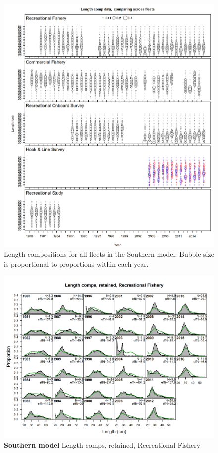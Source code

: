 \documentclass[12pt,]{article}
\begin{document}
\begin{figure}[htbp]
\centering
\includegraphics{r4ss/plots_mod2/comp_lendat__multi-fleet_comparison.png}
\caption{Length compositions for all fleets in the Southern model.
Bubble size is proportional to proportions within each year.
\label{fig:comp_length_bubble_mod2}}
\end{figure}

\begin{figure}[htbp]
\centering
\includegraphics{./r4ss/plots_mod2/comp_lenfit_flt1mkt2.png}
\caption{\textbf{Southern model} Length comps, retained, Recreational
Fishery \label{fig:mod2_1_comp_lenfit_flt1mkt2}}
\end{figure}
\end{document}
